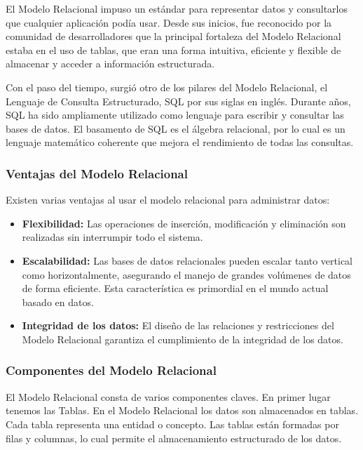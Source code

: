 El Modelo Relacional impuso un estándar para representar datos y consultarlos que cualquier aplicación pod\'ia usar. 
Desde sus inicios, fue reconocido por la comunidad de desarrolladores que la principal fortaleza del Modelo Relacional 
estaba en el uso de tablas, que eran una forma intuitiva, eficiente y flexible de almacenar y acceder a 
información estructurada.

Con el paso del tiempo, surgió otro de los pilares del Modelo Relacional, el Lenguaje de Consulta Estructurado, SQL por 
sus siglas en ingl\'es. Durante años, SQL ha sido ampliamente utilizado como lenguaje para escribir y consultar las bases 
de datos. El basamento de SQL es el \'algebra relacional, por lo cual es un lenguaje matemático coherente que mejora el 
rendimiento de todas las consultas.


\subsubsection{Ventajas del Modelo Relacional}

Existen varias ventajas al usar el modelo relacional para administrar datos:

\begin{itemize}
    \item \textbf{Flexibilidad:} Las operaciones de inserción, modificación y eliminaci\'on son realizadas sin interrumpir
        todo el sistema. 
    
    \item \textbf{Escalabilidad:} Las bases de datos relacionales pueden escalar tanto vertical como horizontalmente, 
        asegurando el manejo de grandes volúmenes de datos de forma eficiente. Esta característica es primordial en el 
        mundo actual basado en datos.

    \item \textbf{Integridad de los datos:} El diseño de las relaciones y restricciones del Modelo Relacional garantiza 
        el cumplimiento de la integridad de los datos. 
\end{itemize}


\subsubsection{Componentes del Modelo Relacional}

El Modelo Relacional consta de varios componentes claves. En primer lugar tenemos las Tablas. En el Modelo Relacional 
los datos son almacenados en tablas. Cada tabla representa una entidad o concepto. Las tablas est\'an formadas por filas 
y columnas, lo cual permite el almacenamiento estructurado de los datos.

